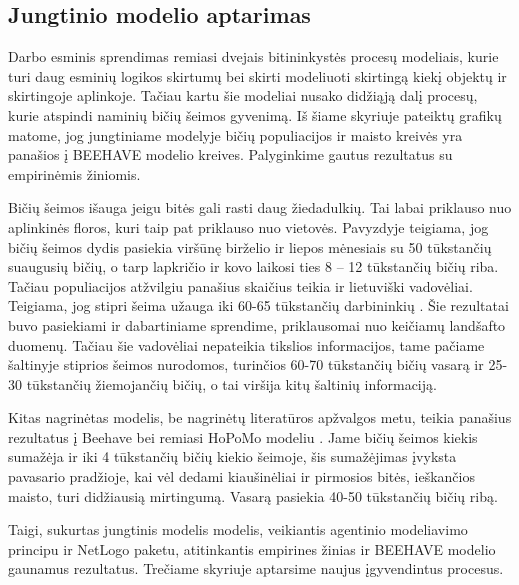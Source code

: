 \documentclass{VUMIFKompMagistrinis}
\begin{document}
\subsection{Jungtinio modelio aptarimas}


Darbo esminis sprendimas remiasi dvejais bitininkystės procesų modeliais, kurie turi daug esminių logikos skirtumų bei skirti modeliuoti skirtingą kiekį objektų ir skirtingoje aplinkoje. Tačiau kartu šie modeliai nusako didžiąją dalį procesų, kurie atspindi naminių bičių šeimos gyvenimą. Iš šiame skyriuje pateiktų grafikų matome, jog jungtiniame modelyje bičių populiacijos ir maisto kreivės yra panašios į BEEHAVE modelio kreives. Palyginkime gautus rezultatus su empirinėmis žiniomis.

Bičių šeimos išauga jeigu bitės gali rasti daug žiedadulkių. Tai labai priklauso nuo aplinkinės floros, kuri taip pat priklauso nuo vietovės. Pavyzdyje \cite{Oli15} teigiama, jog bičių šeimos dydis pasiekia viršūnę birželio ir liepos mėnesiais su 50 tūkstančių suaugusių bičių, o tarp lapkričio ir kovo laikosi ties 8 – 12 tūkstančių bičių riba. Tačiau populiacijos atžvilgiu panašius skaičius teikia ir lietuviški vadovėliai. Teigiama, jog stipri šeima užauga iki 60-65 tūkstančių darbininkių \cite{Kar00}. Šie rezultatai buvo pasiekiami ir dabartiniame sprendime, priklausomai nuo keičiamų landšafto duomenų. Tačiau šie vadovėliai nepateikia tikslios informacijos, tame pačiame šaltinyje stiprios šeimos nurodomos, turinčios 60-70 tūkstančių bičių vasarą ir 25-30 tūkstančių žiemojančių bičių, o tai viršija kitų šaltinių informaciją. 

Kitas nagrinėtas modelis, be nagrinėtų literatūros apžvalgos metu, teikia panašius rezultatus į Beehave bei remiasi HoPoMo modeliu \cite{ScC07,BWZ16}. Jame bičių šeimos kiekis sumažėja ir iki 4 tūkstančių bičių kiekio šeimoje, šis sumažėjimas įvyksta pavasario pradžioje, kai vėl dedami kiaušinėliai ir pirmosios bitės, ieškančios maisto, turi didžiausią mirtingumą. Vasarą pasiekia 40-50 tūkstančių bičių ribą.

Taigi, sukurtas jungtinis modelis modelis, veikiantis agentinio modeliavimo principu ir NetLogo paketu, atitinkantis empirines žinias ir BEEHAVE modelio gaunamus rezultatus. Trečiame skyriuje aptarsime naujus įgyvendintus procesus.
\end{document}

